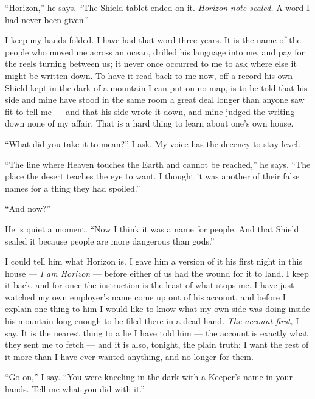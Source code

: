 \ornament

``Horizon,'' he says. ``The Shield tablet ended on it. \textit{Horizon note sealed.} A word I had never been given.''\par

I keep my hands folded. I have had that word three years. It is the name of the people who moved me across an ocean, drilled his language into me, and pay for the reels turning between us; it never once occurred to me to ask where else it might be written down. To have it read back to me now, off a record his own Shield kept in the dark of a mountain I can put on no map, is to be told that his side and mine have stood in the same room a great deal longer than anyone saw fit to tell me --- and that his side wrote it down, and mine judged the writing-down none of my affair. That is a hard thing to learn about one's own house.\par

``What did you take it to mean?'' I ask. My voice has the decency to stay level.\par

``The line where Heaven touches the Earth and cannot be reached,'' he says. ``The place the desert teaches the eye to want. I thought it was another of their false names for a thing they had spoiled.''\par

``And now?''\par

He is quiet a moment. ``Now I think it was a name for people. And that Shield sealed it because people are more dangerous than gods.''\par

I could tell him what Horizon is. I gave him a version of it his first night in this house --- \textit{I am Horizon} --- before either of us had the wound for it to land. I keep it back, and for once the instruction is the least of what stops me. I have just watched my own employer's name come up out of his account, and before I explain one thing to him I would like to know what my own side was doing inside his mountain long enough to be filed there in a dead hand. \textit{The account first,} I say. It is the nearest thing to a lie I have told him --- the account is exactly what they sent me to fetch --- and it is also, tonight, the plain truth: I want the rest of it more than I have ever wanted anything, and no longer for them.\par

``Go on,'' I say. ``You were kneeling in the dark with a Keeper's name in your hands. Tell me what you did with it.''\par

